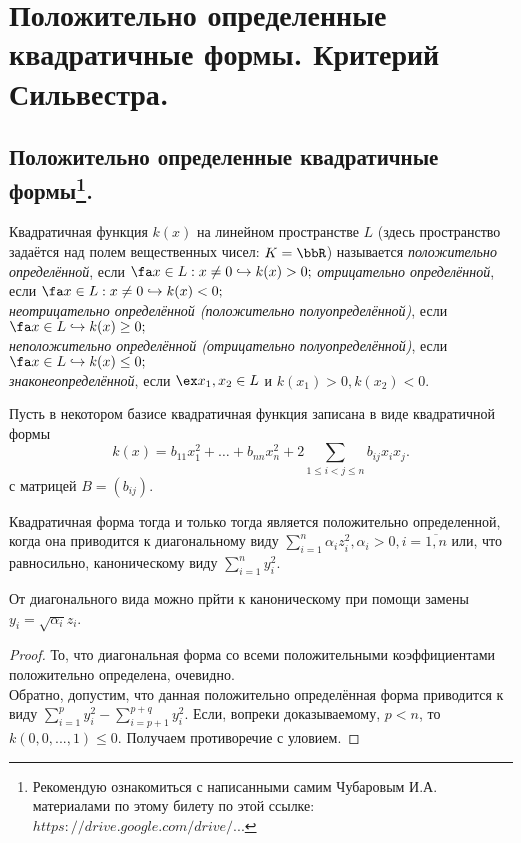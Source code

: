 \chapter{Положительно определенные квадратичные формы. Критерий Сильвестра.}

\section[Положительно определенные квадратичные формы.]{Положительно определенные квадратичные формы\footnote{Рекомендую ознакомиться с написанными самим Чубаровым И.А. материалами по этому билету по этой ссылке: \href{https://drive.google.com/drive/u/0/folders/0BzuzEyNkpwYDcFhhV1l2N1lhY2s}{$https://drive.google.com/drive/...$}}. }
  \begin{defn}
  Квадратичная функция $k(x)$ на линейном пространстве $L$ (здесь пространство задаётся над полем вещественных чисел: $K=\bbR$) называется \textit{положительно определённой}, если $\fa x \in L: x \neq 0 \hookrightarrow k(x)>0;$ \textit{отрицательно определённой}, если $\fa x \in L: x \neq 0 \hookrightarrow k(x)<0;$ \\
\textit{неотрицательно определённой (положительно полуопределённой)}, если $\fa x \in L \hookrightarrow k(x)\ge 0;$ \\
\textit{неположительно определённой (отрицательно полуопределённой)}, если $\fa x \in L \hookrightarrow k(x)\le 0;$ \\
\textit{знаконеопределённой}, если $\ex x_1,x_2 \in L$ и $k(x_1)>0,k(x_2)<0.$ \\
  \end{defn}
  Пусть в некотором базисе квадратичная функция записана в виде квадратичной формы
  \begin{equation}\label{25.1.common}
  k(x)=b_{11}x_1^2+\ldots+b_{nn}x_n^2+2\sum\limits_{1\le i<j\le n} b_{ij}x_ix_j.
  \end{equation}
с матрицей $B=(b_{ij})$.
  \begin{lemm}\label{25.1.lemm}
  Квадратичная форма тогда и только тогда является положительно определенной, когда она приводится к диагональному виду $\sum\limits_{i=1}^n\alpha_iz_i^2, \alpha_i>0, i=\overline{1,n}$ или, что равносильно, каноническому виду $\sum\limits_{i=1}^ny_i^2$.
  \end{lemm}
  \begin{notion}
  От диагонального вида можно прйти к каноническому при помощи замены $y_i=\sqrt{\alpha_i}z_i$.
  \end{notion}
  \begin{proof}
  То, что диагональная форма со всеми положительными коэффициентами положительно определена, очевидно. \\
  Обратно, допустим, что данная положительно определённая форма приводится к виду $\sum\limits_{i=1}^py_i^2-\sum\limits_{i=p+1}^{p+q}y_i^2$. Если, вопреки доказываемому, $p<n$, то $k(0,0,...,1)\le 0$. Получаем противоречие с уловием.
  \end{proof}
